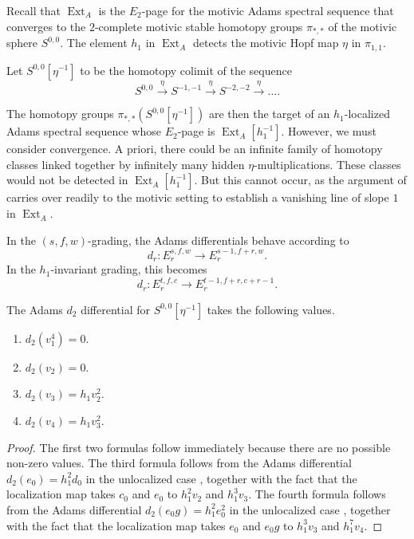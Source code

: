 \documentclass[10pt]{amsart}
\begin{document}
Recall that $\operatorname{Ext}_A$ is the $E_2$-page for the motivic Adams spectral sequence that converges to the $2$-complete motivic stable homotopy groups $\pi_{*,*}$ of the motivic sphere $S^{0,0}$. The element $h_1$ in $\operatorname{Ext}_A$ detects the motivic Hopf map $\eta$ in $\pi_{1,1}$. 

\begin{defn}
Let $S^{0,0}[\eta^{-1}]$ to be the homotopy colimit of the sequence
\[ S^{0,0} \xrightarrow{\eta} S^{-1,-1} \xrightarrow{\eta}S^{-2,-2}\xrightarrow{\eta} \dots.\]
\end{defn}

The homotopy groups $\pi_{*,*}(S^{0,0}[\eta^{-1}])$ are then the target of 
an $h_1$-localized Adams spectral sequence whose $E_2$-page is $\operatorname{Ext}_A[h_1^{-1}]$.
However, we must consider convergence.  A priori, there could be an infinite family of homotopy classes linked together by infinitely many hidden $\eta$-multiplications. These classes would not be detected in $\operatorname{Ext}_A[h_1^{-1}]$. But this cannot occur, as the argument of \cite{A} carries over readily to the motivic setting to establish a vanishing line of slope $1$ in $\operatorname{Ext}_A$.

In the $(s,f,w)$-grading, the Adams differentials behave according to
\[ d_r:E_r^{s,f,w} {\longrightarrow} E_r^{s-1,f+r,w}.\]
In the $h_1$-invariant grading, this becomes
\[ d_r:E_r^{t,f,c} {\longrightarrow} E_r^{t-1,f+r,c+r-1}.\]

\begin{prop}
\label{prop:Adams-d2}
The Adams $d_2$ differential for $S^{0,0}[\eta^{-1}]$ takes the following values.
\begin{enumerate}
\item $d_2(v_1^4) = 0$.
\item $d_2(v_2) = 0$.
\item $d_2(v_3) = h_1v_2^2$.
\item $d_2(v_4) = h_1v_3^2$.
\end{enumerate}
\end{prop}

\begin{proof}
The first two formulas follow immediately because there are no possible
non-zero values.
The third formula follows from the Adams differential $d_2(e_0) = h_1^2 d_0$
 in the unlocalized case \cite{Istems}, together with the fact that
 the localization map takes $c_0$ and $e_0$ to $h_1^2 v_2$ and $h_1^3 v_3$.
The fourth formula follows from the Adams differential $d_2(e_0 g) = h_1^2 e_0^2$
in the unlocalized case \cite{Istems}, together with the fact that
the localization map takes $e_0$ and $e_0 g$ to $h_1^3 v_3$ and $h_1^7 v_4$.
\end{proof}
\end{document}
